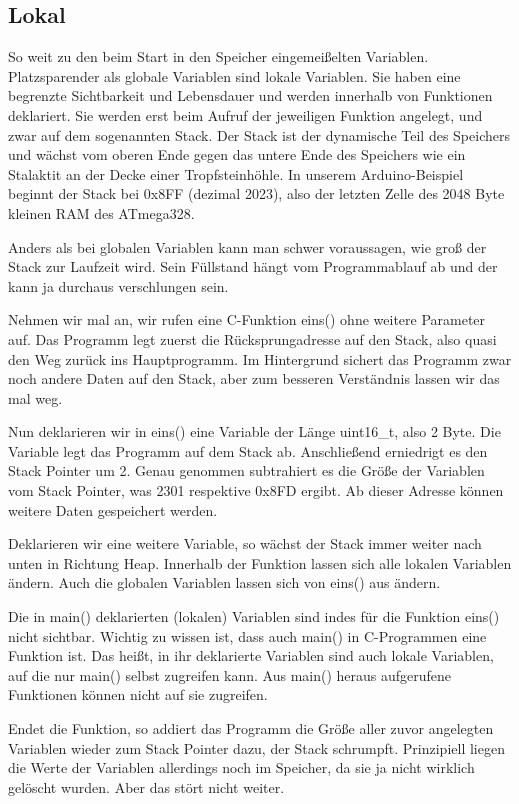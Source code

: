 \subsection{Lokal}
So weit zu den beim Start in den Speicher eingemeißelten Variablen. Platzsparender als globale Variablen sind lokale Variablen. Sie haben eine begrenzte Sichtbarkeit und Lebensdauer und werden innerhalb von Funktionen deklariert. Sie werden erst beim Aufruf der jeweiligen Funktion angelegt, und zwar auf dem sogenannten Stack. Der Stack ist der dynamische Teil des Speichers und wächst vom oberen Ende gegen das untere Ende des Speichers wie ein Stalaktit an der Decke einer Tropfsteinhöhle. In unserem Arduino-Beispiel beginnt der Stack bei 0x8FF (dezimal 2023), also der letzten Zelle des 2048 Byte kleinen RAM des ATmega328.

Anders als bei globalen Variablen kann man schwer voraussagen, wie groß der Stack zur Laufzeit wird. Sein Füllstand hängt vom Programmablauf ab und der kann ja durchaus verschlungen sein.

Nehmen wir mal an, wir rufen eine C-Funktion eins() ohne weitere Parameter auf. Das Programm legt zuerst die Rücksprungadresse auf den Stack, also quasi den Weg zurück ins Hauptprogramm. Im Hintergrund sichert das Programm zwar noch andere Daten auf den Stack, aber zum besseren Verständnis lassen wir das mal weg.

Nun deklarieren wir in eins() eine Variable der Länge uint16\_t, also 2 Byte. Die Variable legt das Programm auf dem Stack ab. Anschließend erniedrigt es den Stack Pointer um 2. Genau genommen subtrahiert es die Größe der Variablen vom Stack Pointer, was 2301 respektive 0x8FD ergibt. Ab dieser Adresse können weitere Daten gespeichert werden.

Deklarieren wir eine weitere Variable, so wächst der Stack immer weiter nach unten in Richtung Heap. Innerhalb der Funktion lassen sich alle lokalen Variablen ändern. Auch die globalen Variablen lassen sich von eins() aus ändern.

Die in main() deklarierten (lokalen) Variablen sind indes für die Funktion eins() nicht sichtbar. Wichtig zu wissen ist, dass auch main() in C-Programmen eine Funktion ist. Das heißt, in ihr deklarierte Variablen sind auch lokale Variablen, auf die nur main() selbst zugreifen kann. Aus main() heraus aufgerufene Funktionen können nicht auf sie zugreifen.

Endet die Funktion, so addiert das Programm die Größe aller zuvor angelegten Variablen wieder zum Stack Pointer dazu, der Stack schrumpft. Prinzipiell liegen die Werte der Variablen allerdings noch im Speicher, da sie ja nicht wirklich gelöscht wurden. Aber das stört nicht weiter.

